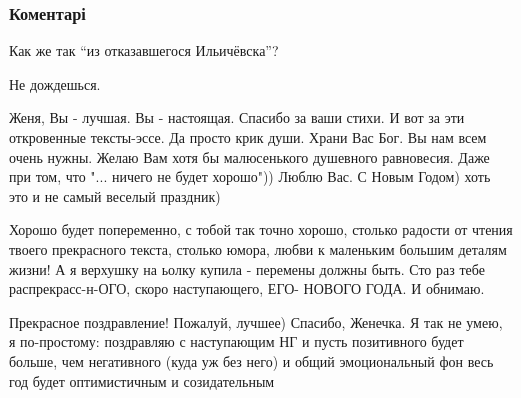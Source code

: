  
 
 
 
 
\subsubsection{Коментарі}
\label{sec:31_12_2014.fb.bilchenko_evgenia.3.tri_jolki.cmt}

\begin{itemize}

Как же так \enquote{из отказавшегося Ильичёвска}? 🙁

Не дождешься.\Smiley[1.0][yellow]

Женя, Вы - лучшая. Вы - настоящая.
Спасибо за ваши стихи. И вот за эти откровенные тексты-эссе. Да просто крик души. Храни Вас Бог. Вы нам всем очень нужны. Желаю Вам хотя бы малюсенького душевного равновесия. Даже при том, что "... ничего не будет хорошо"))
Люблю Вас. С Новым Годом) хоть это и не самый веселый праздник)

Хорошо будет попеременно, с тобой так точно хорошо, столько радости от чтения
твоего прекрасного текста, столько юмора, любви к маленьким большим деталям
жизни! А я верхушку на ьолку купила - перемены должны быть.  Сто раз тебе
распрекрасс-н-ОГО, скоро наступающего, ЕГО- НОВОГО ГОДА.
И обнимаю.


Прекрасное поздравление! Пожалуй, лучшее) Спасибо, Женечка. Я так не умею, я
по-простому: поздравляю с наступающим НГ и пусть позитивного будет больше, чем
негативного (куда уж без него) и общий эмоциональный фон весь год будет
оптимистичным и созидательным \Smiley[1.0][yellow]



\end{itemize}
